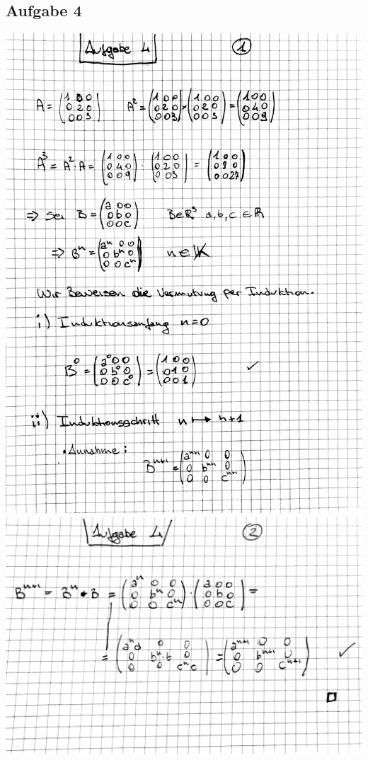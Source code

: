\documentclass[10pt,a4paper]{article}
\begin{document}
\subsection{Aufgabe 4}
	\includegraphics[scale=1]{LA_T2_LSG_5.jpg} 
	\newpage
	\includegraphics[scale=1]{LA_T2_LSG_6.jpg} 
\end{document}

